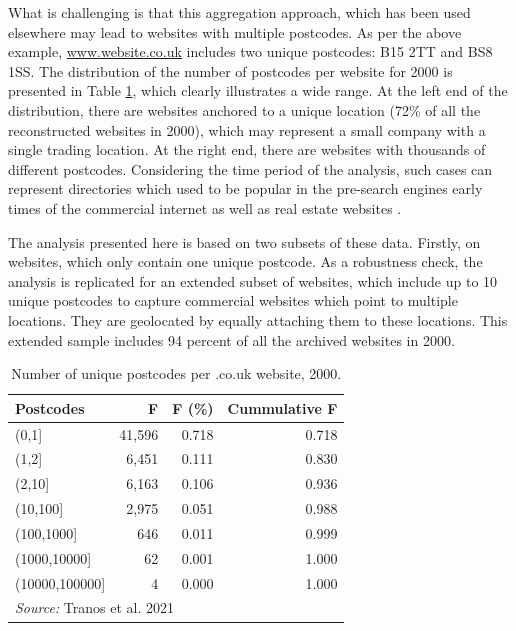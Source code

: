 \documentclass[
  authoryear,
  preprint,
  3p]{elsarticle}
\begin{document}
\noindent What is challenging is that this aggregation approach, which
has been used elsewhere \citep{tranosuk, shoreditch} may lead to
websites with multiple postcodes. As per the above example,
\href{http://www.website.co.uk}{www.website.co.uk} includes two unique
postcodes: B15 2TT and BS8 1SS. The distribution of the number of
postcodes per website for 2000 is presented in Table \ref{f2000}, which
clearly illustrates a wide range. At the left end of the distribution,
there are websites anchored to a unique location (72\% of all the
reconstructed websites in 2000), which may represent a small company
with a single trading location. At the right end, there are websites
with thousands of different postcodes. Considering the time period of
the analysis, such cases can represent directories which used to be
popular in the pre-search engines early times of the commercial internet
as well as real estate websites \citep{tranosuk}.

The analysis presented here is based on two subsets of these data.
Firstly, on websites, which only contain one unique postcode. As a
robustness check, the analysis is replicated for an extended subset of
websites, which include up to 10 unique postcodes to capture commercial
websites which point to multiple locations. They are geolocated by
equally attaching them to these locations. This extended sample includes
94 percent of all the archived websites in 2000.

\begin{table}

\caption{\label{tab:unnamed-chunk-1}Number of unique postcodes per .co.uk website, 2000.\label{f2000}}
\centering
\begin{tabular}[t]{lrrr}
\toprule
Postcodes & F & F (\%) & Cummulative F\\
\midrule
(0,1] & 41,596 & 0.718 & 0.718\\
(1,2] & 6,451 & 0.111 & 0.830\\
(2,10] & 6,163 & 0.106 & 0.936\\
(10,100] & 2,975 & 0.051 & 0.988\\
(100,1000] & 646 & 0.011 & 0.999\\
\addlinespace
(1000,10000] & 62 & 0.001 & 1.000\\
(10000,100000] & 4 & 0.000 & 1.000\\
\bottomrule
\multicolumn{4}{l}{\rule{0pt}{1em}\textit{Source: } Tranos et al. 2021}\\
\end{tabular}
\end{table}
\end{document}
